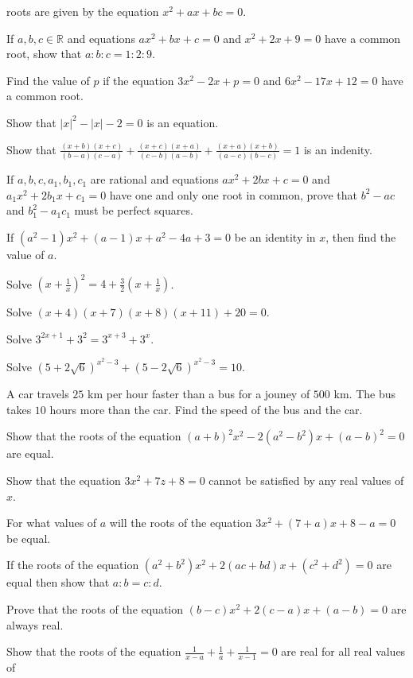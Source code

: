   roots are given by the equation $x^2 + ax + bc = 0$.
\item If $a, b, c\in\mathbb{R}$ and equations $ax^2 + bx + c = 0$ and $x^2 + 2x + 9 = 0$ have a common root, show that $a:b:c =
  1:2:9$.
\item Find the value of $p$ if the equation $3x^2 - 2x + p = 0$ and $6x^2 - 17x + 12 = 0$ have a common root.
\item Show that $|x|^2 - |x| - 2 = 0$ is an equation.
\item Show that $\frac{(x + b)(x + c)}{(b - a)(c - a)} + \frac{(x + c)(x + a)}{(c - b)(a - b)} + \frac{(x + a)(x + b)}{(a - c)(b -
  c)} = 1$ is an indenity.
\item If $a, b, c, a_1, b_1, c_1$ are rational and equations $ax^2 + 2bx + c = 0$ and $a_1x^2 + 2b_1x + c_1 = 0$ have one and only
  one root in common, prove that $b^2 - ac$ and $b_1^2 - a_1c_1$ must be perfect squares.
\item If $(a^2 - 1)x^2 + (a - 1)x + a^2 - 4a + 3 = 0$ be an identity in $x$, then find the value of $a$.
\item Solve $\left(x + \frac{1}{x}\right)^2 = 4 + \frac{3}{2}\left(x + \frac{1}{x}\right)$.
\item Solve $(x + 4)(x + 7)(x + 8)(x + 11) + 20 = 0$.
\item Solve $3^{2x + 1} + 3^2 = 3^{x + 3} + 3^x$.
\item Solve $(5 + 2\sqrt{6})^{x^2 - 3} + (5 - 2\sqrt{6})^{x^2 - 3} = 10$.
\item A car travels $25$ km per hour faster than a bus for a jouney of $500$ km. The bus takes $10$ hours more than the car. Find
  the speed of the bus and the car.
\item Show that the roots of the equation $(a + b)^2x^2 - 2(a^2 - b^2)x + (a - b)^2 = 0$ are equal.
\item Show that the equation $3x^2 + 7z+ 8 = 0$ cannot be satisfied by any real values of $x$.
\item For what values of $a$ will the roots of the equation $3x^2 + (7 + a)x + 8 - a = 0$ be equal.
\item If the roots of the equation $(a^2 + b^2)x^2 + 2(ac + bd)x + (c^2 + d^2) = 0$ are equal then show that $a:b = c:d$.
\item Prove that the roots of the equation $(b - c)x^2 + 2(c - a)x + (a - b) = 0$ are always real.
\item Show that the roots of the equation $\frac{1}{x - a} + \frac{1}{a} + \frac{1}{x - 1} = 0$ are real for all real values of
